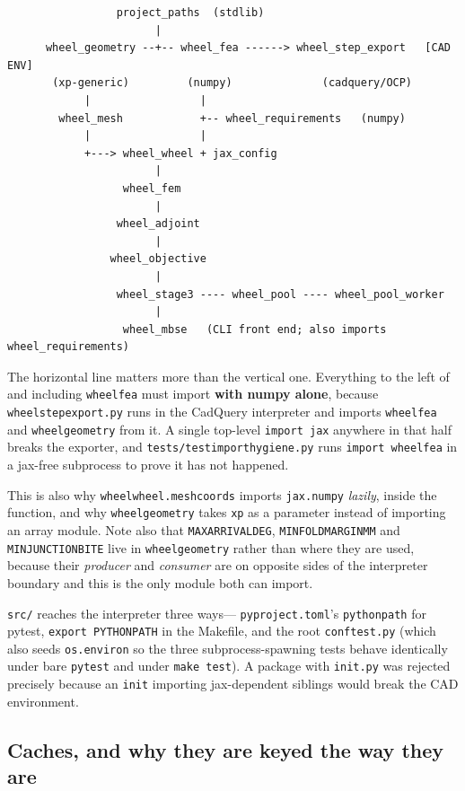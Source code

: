 \documentclass[11pt,a4paper]{article}
\DeclareRobustCommand{\code}[1]{%
  \texttt{\small\def\_{\textunderscore\discretionary{}{}{}}#1}}
\begin{document}
\begin{lstlisting}
                 project_paths  (stdlib)
                       |
      wheel_geometry --+-- wheel_fea ------> wheel_step_export   [CAD ENV]
       (xp-generic)         (numpy)              (cadquery/OCP)
            |                 |
        wheel_mesh            +-- wheel_requirements   (numpy)
            |                 |
            +---> wheel_wheel + jax_config
                       |
                  wheel_fem
                       |
                 wheel_adjoint
                       |
                wheel_objective
                       |
                 wheel_stage3 ---- wheel_pool ---- wheel_pool_worker
                       |
                  wheel_mbse   (CLI front end; also imports wheel_requirements)
\end{lstlisting}

The horizontal line matters more than the vertical one. Everything to the left of and
including \code{wheel\_fea} must import \textbf{with numpy alone}, because
\code{wheel\_step\_export.py} runs in the CadQuery interpreter and imports
\code{wheel\_fea} and \code{wheel\_geometry} from it. A single top-level
\code{import jax} anywhere in that half breaks the exporter, and
\code{tests/test\_import\_hygiene.py} runs \code{import wheel\_fea} in a jax-free
subprocess to prove it has not happened.

This is also why \code{wheel\_wheel.mesh\_coords} imports \code{jax.numpy}
\emph{lazily}, inside the function, and why \code{wheel\_geometry} takes \code{xp} as a
parameter instead of importing an array module. Note also that
\code{MAX\_ARRIVAL\_DEG}, \code{MIN\_FOLD\_MARGIN\_MM} and \code{MIN\_JUNCTION\_BITE}
live in \code{wheel\_geometry} rather than where they are used, because their
\emph{producer} and \emph{consumer} are on opposite sides of the interpreter boundary
and this is the only module both can import.

\code{src/} reaches the interpreter three ways---\code{pyproject.toml}'s
\code{pythonpath} for pytest, \code{export PYTHONPATH} in the Makefile, and the root
\code{conftest.py} (which also seeds \code{os.environ} so the three subprocess-spawning
tests behave identically under bare \code{pytest} and under \code{make test}). A package
with \code{\_\_init\_\_.py} was rejected precisely because an \code{\_\_init\_\_}
importing jax-dependent siblings would break the CAD environment.

\subsection{Caches, and why they are keyed the way they are}
\label{sec:caches}
\end{document}
